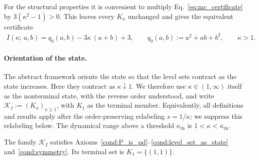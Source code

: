 \documentclass{article}
\begin{document}
For the structural properties it is convenient to multiply
Eq.~\eqref{eq:mc_certificate} by $3(\kappa^2-1)>0$. This leaves every
$K_\kappa$ unchanged and gives the equivalent certificate
\begin{align}
    I(\kappa;\,a,b)
    = q_0(a,b) - 3\kappa\,(a+b) + 3,
    \qquad
    q_0(a,b) := a^2+ab+b^2,
    \qquad
    \kappa>1 .
    \label{eq:mc_unnormalized}
\end{align}

\paragraph{Orientation of the state.}
The abstract framework orients the state so that the level sets contract as
the state increases. Here they contract as $\kappa\downarrow1$. We therefore
use $\kappa\in(1,\infty)$ itself as the nonterminal state, with the reverse
order understood, and write $\mathcal K_I:=(K_\kappa)_{\kappa\ge1}$, with
$K_1$ as the terminal member. Equivalently, all definitions and results apply
after the order-preserving relabeling $s=1/\kappa$; we suppress this relabeling
below. The dynamical range above a threshold $\kappa_{\mathrm{th}}$ is
$1<\kappa<\kappa_{\mathrm{th}}$.

\begin{proposition}
\label{prop:mc_structural_axioms}
The family $\mathcal K_I$ satisfies
Axioms~\ref{cond:P_is_pd}--\ref{cond:level_set_as_state}
and~\ref{cond:symmetry}. Its terminal set is $K_1=\{(1,1)\}$.
\end{proposition}
\end{document}
